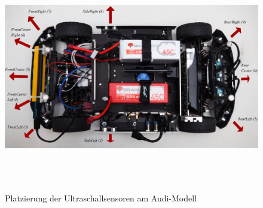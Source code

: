 \documentclass[12pt, a4paper]{scrartcl}
\begin{document}
\begin{figure}[ht]
	\centering
	\includegraphics[width=\textwidth, height=10cm, keepaspectratio]{Bilder/car_sensors.jpg}
	\caption{Platzierung der Ultraschallsensoren am Audi-Modell}
	\label{img:car_ussensors}
\end{figure}

\end{document}
